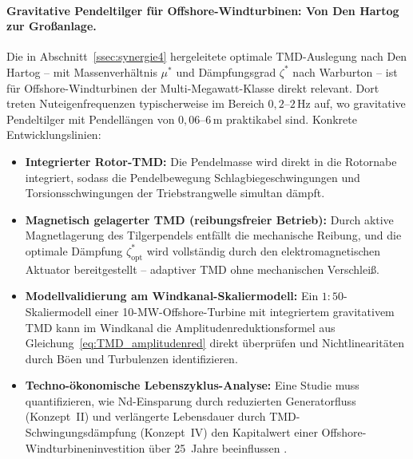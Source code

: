 ﻿\documentclass[12pt, a4paper]{report}
\theoremstyle{definition}
\theoremstyle{remark}
\begin{document}
\paragraph{Gravitative Pendeltilger für Offshore-Windturbinen: Von Den Hartog
zur Großanlage.}
Die in Abschnitt~\ref{ssec:synergie4} hergeleitete optimale TMD-Auslegung nach
Den Hartog \cite{denhartog1956} -- mit Massenverhältnis $\mu^*$ und Dämpfungsgrad
$\zeta^*$ nach Warburton \cite{warburton1982} -- ist für Offshore-Windturbinen
der Multi-Megawatt-Klasse direkt relevant. Dort treten Nuteigenfrequenzen
typischerweise im Bereich $0{,}2$--$2\,\si{\hertz}$ auf, wo gravitative
Pendeltilger mit Pendellängen von $0{,}06$--$6\,\si{\metre}$ praktikabel sind.
Konkrete Entwicklungslinien:
\begin{itemize}
  \item \textbf{Integrierter Rotor-TMD:} Die Pendelmasse wird direkt in die
        Rotornabe integriert, sodass die Pendelbe\-wegung Schlagbiegeschwingungen
        und Torsionsschwingungen der Triebstrangwelle simultan dämpft.
  \item \textbf{Magnetisch gelagerter TMD (reibungsfreier Betrieb):} Durch
        aktive Magnetlagerung des Tilgerpendels entfällt die mechanische Reibung,
        und die optimale Dämpfung $\zeta^*_{\text{opt}}$ wird vollständig durch
        den elektromagnetischen Aktuator bereitgestellt -- adaptiver TMD ohne
        mechanischen Verschleiß.
  \item \textbf{Modellvalidierung am Windkanal-Skaliermodell:} Ein $1:50$-Skaliermodell
        einer 10-MW-Offshore-Turbine mit integriertem gravitativem TMD kann im
        Windkanal die Amplitudenreduktionsformel aus
        Gleichung~\eqref{eq:TMD_amplitudenred} direkt überprüfen und
        Nichtlinearitäten durch Böen und Turbulenzen identifizieren.
  \item \textbf{Techno-ökonomische Lebenszyklus-Analyse:} Eine Studie muss
        quantifizieren, wie Nd-Einsparung durch reduzierten Generatorfluss
        (Konzept~II) und verlängerte Lebensdauer durch TMD-Schwingungsdämpfung
        (Konzept~IV) den Kapitalwert einer Offshore-Windturbineninvestition über
        25~Jahre beeinflussen \cite{muller2002}.
\end{itemize}
\end{document}
